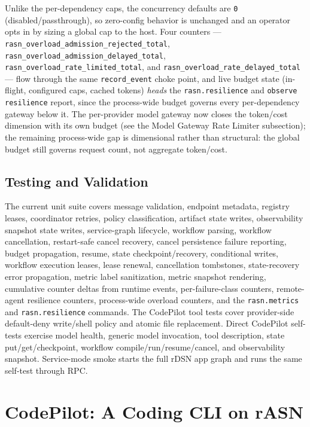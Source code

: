 \documentclass[manuscript,screen,review]{acmart}
\newcommand{\rasn}{rASN\xspace}
\newcommand{\rdsn}{rDSN\xspace}
\newcommand{\codepilot}{CodePilot\xspace}
\begin{document}
Unlike the per-dependency caps, the concurrency defaults are \texttt{0}
(disabled/passthrough), so zero-config behavior is unchanged and an operator opts in
by sizing a global cap to the host. Four counters ---
\texttt{rasn\_overload\_admission\_rejected\_total},
\texttt{rasn\_overload\_admission\_delayed\_total},
\texttt{rasn\_overload\_rate\_limited\_total}, and
\texttt{rasn\_overload\_rate\_delayed\_total} --- flow through the same
\texttt{record\_event} choke point, and live budget state (in-flight, configured
caps, cached tokens) \emph{heads} the \texttt{rasn.resilience} and
\texttt{observe resilience} report, since the process-wide budget governs every
per-dependency gateway below it. The per-provider model gateway now closes the
token/cost dimension with its own budget (see the Model Gateway Rate Limiter
subsection); the remaining process-wide gap is dimensional rather than structural:
the global budget still governs request count, not aggregate token/cost.

\subsection{Testing and Validation}

The current unit suite covers message validation, endpoint metadata, registry
leases, coordinator retries, policy classification, artifact state writes,
observability snapshot state writes, service-graph lifecycle, workflow parsing,
workflow cancellation, restart-safe cancel recovery, cancel persistence failure
reporting, budget propagation, resume, state checkpoint/recovery, conditional
writes, workflow execution leases, lease renewal, cancellation tombstones,
state-recovery error propagation, metric label sanitization, metric snapshot
rendering, cumulative counter deltas from runtime events, per-failure-class
counters, remote-agent resilience counters, process-wide overload counters, and the
\texttt{rasn.metrics} and
\texttt{rasn.resilience} commands. The CodePilot tool tests cover
provider-side default-deny write/shell policy and atomic file replacement. Direct
\codepilot self-tests
exercise model health, generic model invocation, tool description, state
put/get/checkpoint, workflow compile/run/resume/cancel, and observability
snapshot. Service-mode smoke starts the full \rdsn app graph and runs the same
self-test through RPC.

\section{\codepilot: A Coding CLI on \rasn}
\end{document}
